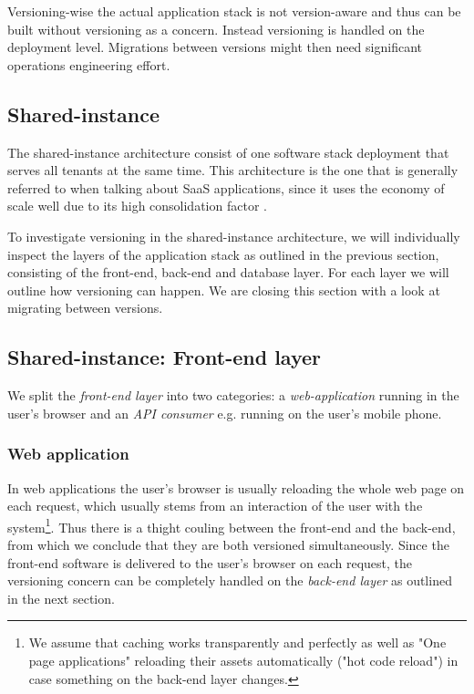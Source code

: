 Versioning-wise the actual application stack is not version-aware and thus can be built without versioning as a concern. Instead versioning is handled on the deployment level. Migrations between versions might then need significant operations engineering effort.

\subsection{Shared-instance}

The shared-instance architecture consist of one software stack deployment that serves all tenants at the same time. This architecture is the one that is generally referred to when talking about SaaS applications, since it uses the economy of scale well due to its high consolidation factor \cite{Mietzner2009} \cite{Bezemer2010} \cite{Chong2006}.

To investigate versioning in the shared-instance architecture, we will individually inspect the layers of the application stack as outlined in the previous section, consisting of the front-end, back-end and database layer. For each layer we will outline how versioning can happen. We are closing this section with a look at migrating between versions.

\subsection{Shared-instance: Front-end layer}
\label{sec:sharedfrontend}

We split the \emph{front-end layer} into two categories: a \emph{web-application} running in the user's browser and an \emph{API consumer} e.g. running on the user's mobile phone.

\subsubsection{Web application} In web applications the user's browser is usually reloading the whole web page on each request, which usually stems from an interaction of the user with the system\footnote{We assume that caching works transparently and perfectly as well as "One page applications" reloading their assets automatically ("hot code reload") in case something on the back-end layer changes.}. Thus there is a thight couling between the front-end and the back-end, from which we conclude that they are both versioned simultaneously. Since the front-end software is delivered to the user's browser on each request, the versioning concern can be completely handled on the \emph{back-end layer} as outlined in the next section.

